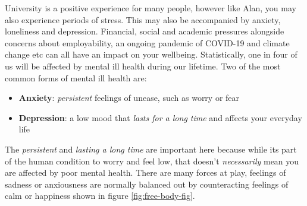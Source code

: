 \documentclass[
]{book}
\providecommand{\tightlist}{%
  \setlength{\itemsep}{0pt}\setlength{\parskip}{0pt}}
\begin{document}
University is a positive experience for many people, however like Alan, you may also experience periods of stress. This may also be accompanied by anxiety, loneliness and depression. Financial, social and academic pressures alongside concerns about employability, an ongoing pandemic of COVID-19 and climate change etc can all have an impact on your wellbeing. Statistically, one in four of us will be affected by mental ill health during our lifetime. Two of the most common forms of mental ill health are:

\begin{itemize}
\tightlist
\item
  \textbf{Anxiety}: \emph{persistent} feelings of unease, such as worry or fear
\item
  \textbf{Depression}: a low mood that \emph{lasts for a long time} and affects your everyday life
\end{itemize}

The \emph{persistent} and \emph{lasting a long time} are important here because while its part of the human condition to worry and feel low, that doesn't \emph{necessarily} mean you are affected by poor mental health. There are many forces at play, feelings of sadness or anxiousness are normally balanced out by counteracting feelings of calm or happiness shown in figure \ref{fig:free-body-fig}.
\end{document}

